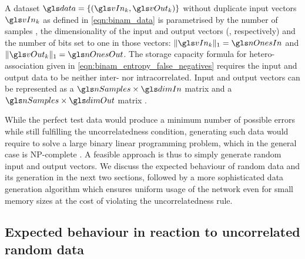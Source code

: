 A dataset \(\data = \{(\vIn_k, \vOut_k)\}\) without duplicate input vectors \(\vIn_k\) as defined in \cref{eqn:binam_data} is parametrised by the number of samples \nSamples, the dimensionality of the input and output vectors (\dimIn, \dimOut respectively) and the number of bits set to one in those vectors: \(\|\vIn_k\|_1 = \nOnesIn\) and \(\|\vOut_k\|_1 = \nOnesOut\). The storage capacity formula for hetero-association given in \cref{eqn:binam_entropy_false_negatives} requires the input and output data to be neither inter- nor intracorrelated. Input and output vectors can be represented as a $\nSamples \times \dimIn$ matrix \matIn and a $\nSamples \times \dimOut$ matrix \matOut.

While the perfect test data would produce a minimum number of possible errors while still fulfilling the uncorrelatedness condition, generating such data would require to solve a large binary linear programming problem, which in the general case is NP-complete \cite{karp1972reducibility}. A feasible approach is thus to simply generate random input and output vectors. We discuss the expected behaviour of random data and its generation in the next two sections, followed by a more sophisticated data generation algorithm which ensures uniform usage of the network even for small memory sizes at the cost of violating the uncorrelatedness rule.

\subsection{Expected behaviour in reaction to uncorrelated random data}
\label{sec:binam_random_data_behaviour}

